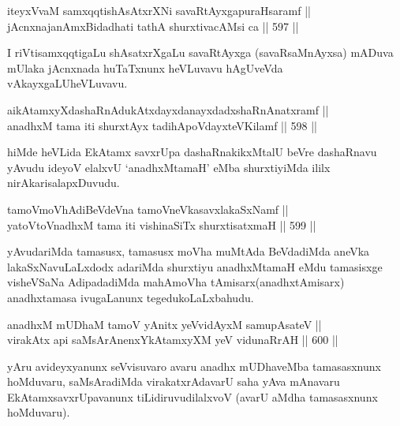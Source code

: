 \begin{shl}
iteyxVvaM samxqqtishAsAtxrXNi savaRtAyxgapuraHsaramf || \\
jAcnxnajanAmxBidadhati tathA shurxtivacAMsi ca \hfill || 597 ||  
\end{shl}

\begin{artha}
I riVtisamxqqtigaLu shAsatxrXgaLu savaRtAyxga (savaRsaMnAyxsa) mADuva mUlaka jAcnxnada huTaTxnunx heVLuvavu hAgUveVda vAkayxgaLU\break heVLuvavu.
\end{artha}

\begin{shl}
aikAtamxyXdashaRnAdukAtxdayxdanayxdadxshaRnAnatxramf || \\
anadhxM tama iti shurxtAyx tadihApoVdayxteV\s Kilamf \hfill || 598 ||  
\end{shl}

\begin{artha}
hiMde heVLida EkAtamx savxrUpa dashaRnakikxMtalU beVre dashaRnavu yAvudu ideyoV elalxvU `anadhxMtamaH' eMba shurxtiyiMda ililx nirAkarisalapxDuvudu.
\end{artha}


\begin{shl}
tamoVmoVhAdiBeVdeVna tamoV\s neVkasavxlakaSxNamf || \\
yatoV\s toV\s nadhxM tama iti vishinaSiTx shurxtisatxmaH \hfill || 599 ||  
\end{shl}

\begin{artha}
yAvudariMda tamasusx, tamasusx moVha muMtAda BeVdadiMda
aneVka lakaSxNavuLaLxdodx adariMda shurxtiyu anadhxMtamaH eMdu
tamasisxge visheVSaNa AdipadadiMda mahAmoVha tAmisarx\break (anadhxtAmisarx)
anadhxtamasa ivugaLanunx tegedukoLaLxbahudu.
\end{artha}

\begin{shl}
anadhxM mUDhaM tamoV yAnitx yeV\s vidAyxM samupAsateV || \\
virakAtx api saMsArAnenxYkAtamxyXM yeV vidunaRrAH \hfill || 600 ||  
\end{shl}

\begin{artha}
yAru avideyxyanunx seVvisuvaro avaru anadhx mUDhaveMba tamasasxnunx hoMduvaru, saMsAradiMda virakatxrAdavarU saha yAva mAnavaru EkAtamxsavxrUpavanunx tiLidiruvudilalxvoV (avarU aMdha tamasasxnunx hoMduvaru).
\end{artha}

